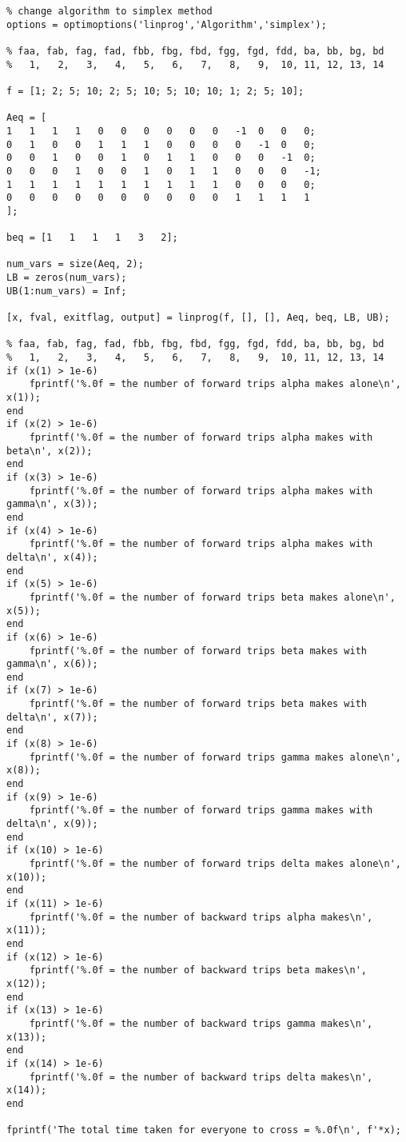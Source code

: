 \documentclass{article}
\begin{document}
\begin{lstlisting}
% change algorithm to simplex method
options = optimoptions('linprog','Algorithm','simplex');

% faa, fab, fag, fad, fbb, fbg, fbd, fgg, fgd, fdd, ba, bb, bg, bd
%   1,   2,   3,   4,   5,   6,   7,   8,   9,  10, 11, 12, 13, 14

f = [1; 2; 5; 10; 2; 5; 10; 5; 10; 10; 1; 2; 5; 10];

Aeq = [
1   1   1   1   0   0   0   0   0   0   -1  0   0   0;
0   1   0   0   1   1   1   0   0   0   0   -1  0   0;
0   0   1   0   0   1   0   1   1   0   0   0   -1  0;
0   0   0   1   0   0   1   0   1   1   0   0   0   -1;
1   1   1   1   1   1   1   1   1   1   0   0   0   0;
0   0   0   0   0   0   0   0   0   0   1   1   1   1
];

beq = [1   1   1   1   3   2];

num_vars = size(Aeq, 2);
LB = zeros(num_vars);
UB(1:num_vars) = Inf;

[x, fval, exitflag, output] = linprog(f, [], [], Aeq, beq, LB, UB);

% faa, fab, fag, fad, fbb, fbg, fbd, fgg, fgd, fdd, ba, bb, bg, bd
%   1,   2,   3,   4,   5,   6,   7,   8,   9,  10, 11, 12, 13, 14
if (x(1) > 1e-6)
	fprintf('%.0f = the number of forward trips alpha makes alone\n', x(1));
end
if (x(2) > 1e-6)
	fprintf('%.0f = the number of forward trips alpha makes with beta\n', x(2));
end
if (x(3) > 1e-6)
	fprintf('%.0f = the number of forward trips alpha makes with gamma\n', x(3));
end
if (x(4) > 1e-6)
	fprintf('%.0f = the number of forward trips alpha makes with delta\n', x(4));
end
if (x(5) > 1e-6)
	fprintf('%.0f = the number of forward trips beta makes alone\n', x(5));
end
if (x(6) > 1e-6)
	fprintf('%.0f = the number of forward trips beta makes with gamma\n', x(6));
end
if (x(7) > 1e-6)
	fprintf('%.0f = the number of forward trips beta makes with delta\n', x(7));
end
if (x(8) > 1e-6)
	fprintf('%.0f = the number of forward trips gamma makes alone\n', x(8));
end
if (x(9) > 1e-6)
	fprintf('%.0f = the number of forward trips gamma makes with delta\n', x(9));
end
if (x(10) > 1e-6)
	fprintf('%.0f = the number of forward trips delta makes alone\n', x(10));
end
if (x(11) > 1e-6)
	fprintf('%.0f = the number of backward trips alpha makes\n', x(11));
end
if (x(12) > 1e-6)
	fprintf('%.0f = the number of backward trips beta makes\n', x(12));
end
if (x(13) > 1e-6)
	fprintf('%.0f = the number of backward trips gamma makes\n', x(13));
end
if (x(14) > 1e-6)
	fprintf('%.0f = the number of backward trips delta makes\n', x(14));
end

fprintf('The total time taken for everyone to cross = %.0f\n', f'*x);
\end{lstlisting}
\end{document}
